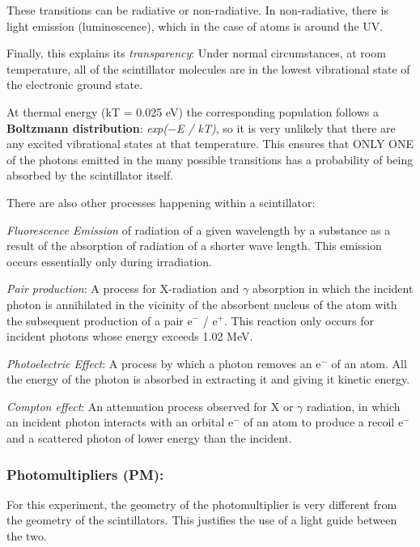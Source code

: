 These transitions can be radiative or non-radiative. In non-radiative, there is light emission (luminescence), which in the case of atoms is around the UV.

Finally, this explains its \textit{transparency}: Under normal circumstances, at room temperature, all of the scintillator molecules are in the lowest vibrational state of the electronic ground state.

At thermal energy (kT = 0.025 eV) the corresponding population follows a \textbf{Boltzmann distribution}: \textit{exp($-$E / kT)}, so it is very unlikely that there are any excited vibrational states at that temperature. This ensures that ONLY ONE of the photons emitted in the many possible transitions has a probability of being absorbed by the scintillator itself.

There are also other processes happening within a scintillator:

	\bi
		\item \textit{Fluorescence Emission} of radiation of a given wavelength by a substance as a result of the absorption of radiation of a shorter wave length. This emission occurs essentially only during irradiation.

		\item \textit{Pair production}: A process for X-radiation and $\gamma$ absorption in which the incident photon is annihilated in the vicinity of the absorbent nucleus of the atom with the subsequent production of a pair e$^-$ / e$^+$. This reaction only occurs for incident photons whose energy exceeds 1.02 MeV.

		\item \textit{Photoelectric Effect}: A process by which a photon removes an e$^-$ of an atom. All the energy of the photon is absorbed in extracting it and giving it kinetic energy.

		\item \textit{Compton effect}: An attenuation process observed for X or $\gamma$ radiation, in which an incident photon interacts with an orbital e$^-$ of an atom to produce a recoil e$^-$ and a scattered photon of lower energy than the incident.
	\ei

		\subsubsection{Photomultipliers (PM):}

		For this experiment, the geometry of the photomultiplier is very different from the geometry of the scintillators. This justifies the use of a light guide between the two.

